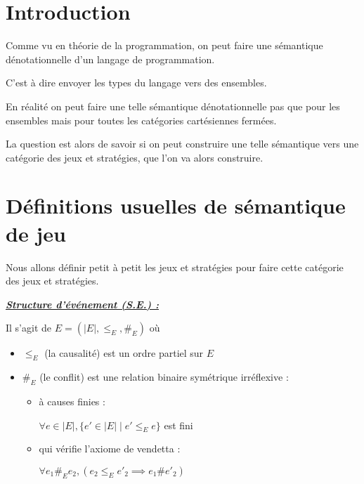 \documentclass[a4paper,12ptCOUCOU
]{article}
\title{\letitle}
\author{\leauthor}
\date{}
\newlength{\mydepth}
\newlength{\myheight}
\newenvironment{answer}[1]
{\vspace{0.5cm}\begin{minipage}{\linewidth}\textbf{\textit{\underline{#1}}}\par\begin{lrbox}{\mybox}\quad\begin{minipage}{\linewidth}\color{black}\setlength{\parskip}{10pt}}
{\end{minipage}\end{lrbox}
\settodepth{\mydepth}{\usebox{\mybox}}
\settoheight{\myheight}{\usebox{\mybox}}
\addtolength{\myheight}{\mydepth}
\noindent\makebox[0pt]{
  \color{gray}\hspace{-0pt}\rule[-\mydepth]{1pt}{\myheight}}
\usebox{\mybox}
\end{minipage}
  }
\begin{document}
\maketitle

\newpage

\section{Introduction}

Comme vu en théorie de la programmation, on peut faire une sémantique
dénotationnelle d'un langage de programmation.

C'est à dire envoyer les types du langage vers des ensembles.

En réalité on peut faire une telle sémantique dénotationnelle pas que pour les
ensembles mais pour toutes les catégories cartésiennes fermées.

La question est alors de savoir si on peut construire une telle sémantique vers
une catégorie des jeux et stratégies, que l'on va alors construire.

\newpage
\section{Définitions usuelles de sémantique de jeu}

Nous allons définir petit à petit les jeux et stratégies pour faire
cette catégorie des jeux et stratégies.

\begin{answer}{Structure d'événement (S.E.) :}

Il s'agit de $E = (|E|, \leq_E, \#_E)$ où
\begin{itemize}
\item $\leq_E$ (la causalité) est un ordre partiel sur $E$
\item $\#_E$ (le conflit) est une relation binaire symétrique irréflexive :
\begin{itemize}
\item à causes finies :

$\forall e \in |E|, \{e' \in |E| \mid e' \leq_E e\}$ est fini

\item qui vérifie l'axiome de vendetta :

$\forall e_1 \#_E e_2, (e_2 \leq_E e'_2 \implies e_1 \# e'_2)$
\end{itemize}
\end{itemize}
\end{answer}
\end{document}
